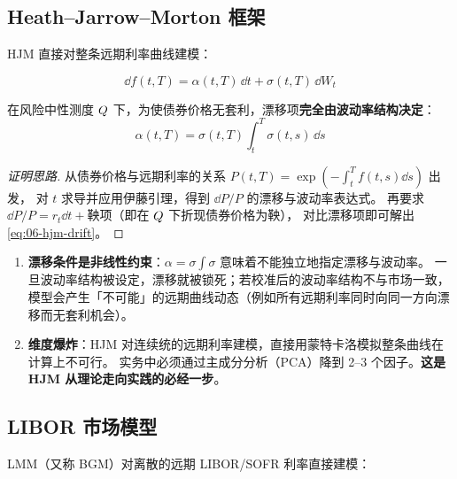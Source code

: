 \subsection{Heath--Jarrow--Morton 框架}

HJM 直接对整条远期利率曲线建模：

\begin{equation}
  \dd f(t,T) = \alpha(t,T)\,\dd t+\sigma(t,T)\,\dd W_t
  \label{eq:06-hjm}
\end{equation}

\begin{theorem}\label{thm:06-hjm}
在风险中性测度 $Q$ 下，为使债券价格无套利，漂移项\textbf{完全由波动率结构决定}：
\begin{equation}
  \alpha(t,T) = \sigma(t,T)\int_t^{T}\sigma(t,s)\,\dd s
  \label{eq:06-hjm-drift}
\end{equation}
\end{theorem}

\begin{proof}[证明思路]
从债券价格与远期利率的关系 $P(t,T)=\exp\left(-\int_t^T f(t,s)\dd s\right)$ 出发，
对 $t$ 求导并应用伊藤引理，得到 $\dd P/P$ 的漂移与波动率表达式。
再要求 $\dd P/P = r_t\dd t+\text{鞅项}$（即在 $Q$ 下折现债券价格为鞅），
对比漂移项即可解出 \cref{eq:06-hjm-drift}。
\end{proof}

\begin{warningbox}
\begin{enumerate}[leftmargin=1.6em]
  \item \textbf{漂移条件是非线性约束}：$\alpha = \sigma\int\sigma$ 意味着不能独立地指定漂移与波动率。
        一旦波动率结构被设定，漂移就被锁死；若校准后的波动率结构不与市场一致，
        模型会产生「不可能」的远期曲线动态（例如所有远期利率同时向同一方向漂移而无套利机会）。
  \item \textbf{维度爆炸}：HJM 对连续统的远期利率建模，直接用蒙特卡洛模拟整条曲线在计算上不可行。
        实务中必须通过主成分分析（PCA）降到 2--3 个因子。\textbf{这是 HJM 从理论走向实践的必经一步}。
\end{enumerate}
\end{warningbox}

\subsection{LIBOR 市场模型}\label{sec:06-lmm}

LMM（又称 BGM）对离散的远期 LIBOR/SOFR 利率直接建模：

